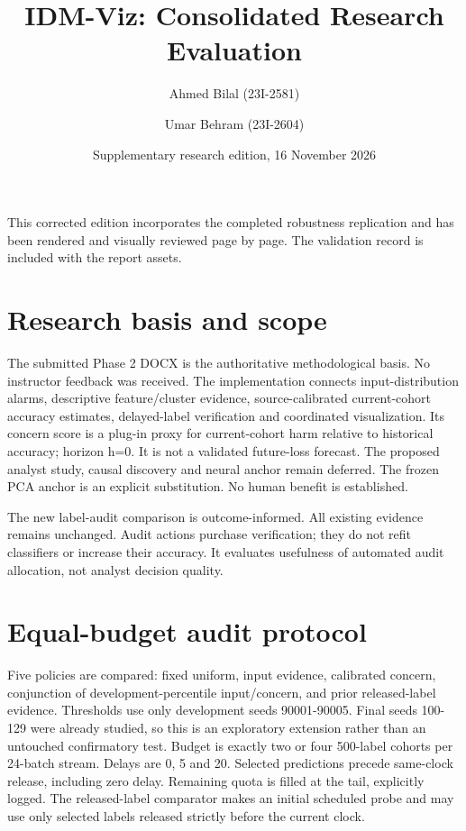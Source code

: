 \documentclass[11pt,a4paper]{article}
\title{IDM-Viz: Consolidated Research Evaluation}
\author{Ahmed Bilal (23I-2581) \and Umar Behram (23I-2604)}
\date{Supplementary research edition, 16 November 2026}
\begin{document}
\maketitle
\noindent This corrected edition incorporates the completed robustness replication and has been rendered and visually reviewed page by page. The validation record is included with the report assets.\par

\section{Research basis and scope}

The submitted Phase 2 DOCX is the authoritative methodological basis. No instructor feedback was received. The implementation connects input-distribution alarms, descriptive feature/cluster evidence, source-calibrated current-cohort accuracy estimates, delayed-label verification and coordinated visualization. Its concern score is a plug-in proxy for current-cohort harm relative to historical accuracy; horizon h=0. It is not a validated future-loss forecast. The proposed analyst study, causal discovery and neural anchor remain deferred. The frozen PCA anchor is an explicit substitution. No human benefit is established.\par

The new label-audit comparison is outcome-informed. All existing evidence remains unchanged. Audit actions purchase verification; they do not refit classifiers or increase their accuracy. It evaluates usefulness of automated audit allocation, not analyst decision quality.\par

\section{Equal-budget audit protocol}

Five policies are compared: fixed uniform, input evidence, calibrated concern, conjunction of development-percentile input/concern, and prior released-label evidence. Thresholds use only development seeds 90001-90005. Final seeds 100-129 were already studied, so this is an exploratory extension rather than an untouched confirmatory test. Budget is exactly two or four 500-label cohorts per 24-batch stream. Delays are 0, 5 and 20. Selected predictions precede same-clock release, including zero delay. Remaining quota is filled at the tail, explicitly logged. The released-label comparator makes an initial scheduled probe and may use only selected labels released strictly before the current clock.\par
\end{document}
